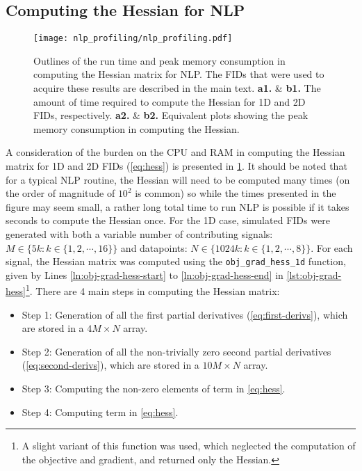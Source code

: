 \subsection{Computing the Hessian for \acs{NLP}}
\begin{figure}
    \centering
    \texttt{[image: nlp\_profiling/nlp\_profiling.pdf]}
    \caption[
        Outlines of the run times and peak memory consumption in
        computing the Hessian matrix for \acs{NLP}.
    ]
    {
        Outlines of the run time and peak memory consumption in
        computing the Hessian matrix for \acs{NLP}.
        The \acp{FID} that were used to acquire these results are described in
        the main text.
        \textbf{a1.} \& \textbf{b1.} The amount of time required to compute the
        Hessian for \ac{1D} and \ac{2D} \acp{FID}, respectively.
        \textbf{a2.} \& \textbf{b2.} Equivalent plots showing the peak memory
        consumption in computing the Hessian.
    }
    \label{fig:nlp-profiling}
\end{figure}
A consideration of the burden on the \ac{CPU} and \ac{RAM} in computing the
Hessian matrix for \ac{1D} and \ac{2D} \acp{FID} (\cref{eq:hess}) is presented in
\cref{fig:nlp-profiling}.
It should be noted that for a typical \ac{NLP} routine, the Hessian will need
to be computed many times (on the order of magnitude of $10^2$ is common) so
while the times presented in the figure may seem small, a rather long total
time to run \ac{NLP} is possible if it takes seconds to compute the Hessian
once.
For the \ac{1D} case, simulated \acp{FID} were generated
with both a variable number of contributing signals: $M \in \lbrace 5k : k \in
\lbrace 1, 2, \cdots, 16 \rbrace \rbrace$ and datapoints: $N \in \lbrace 1024k
: k \in \lbrace 1, 2, \cdots, 8 \rbrace \rbrace$. For each signal, the Hessian
matrix was computed using the \texttt{obj\_grad\_hess\_1d} function, given by
Lines \ref{ln:obj-grad-hess-start} to \ref{ln:obj-grad-hess-end} in
\cref{lst:obj-grad-hess}\footnote{
    A slight variant of this function was used, which neglected the computation
    of the objective and gradient, and returned only the Hessian.
}. There are 4 main steps in computing the Hessian matrix:
\begin{itemize}
    \item Step 1: Generation of all the first partial derivatives
        (\cref{eq:first-derivs}), which are stored in a $4M \times N$ array.
    \item Step 2: Generation of all the non-trivially zero second partial
        derivatives (\cref{eq:second-derivs}), which are stored in a $10M
        \times N$ array.
    \item Step 3: Computing the non-zero elements of term  in
        \cref{eq:hess}.
    \item Step 4: Computing term  in \cref{eq:hess}.
\end{itemize}
